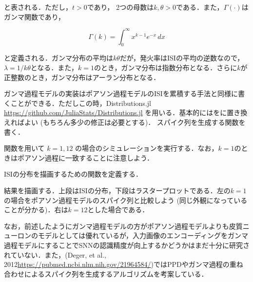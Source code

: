 と表される．ただし，$t > 0$であり， 2つの母数は$k, \theta > 0$である．また，$\Gamma (\cdot)$はガンマ関数であり，


\begin{equation}
\Gamma (k)=\int _{0}^{\infty }x^{k-1}e^{-x}\,dx
\end{equation}


と定義される．ガンマ分布の平均は$k\theta$だが，発火率はISIの平均の逆数なので，$\lambda=1/k\theta$となる．また，$k=1$のとき，ガンマ分布は指数分布となる．さらに$k$が正整数のとき，ガンマ分布はアーラン分布となる．

ガンマ過程モデルの実装はポアソン過程モデルのISIを累積する手法と同様に書くことができる．ただしこの時，Distributions.jl \url{https://github.com/JuliaStats/Distributions.jl} を用いる．基本的にはをに置き換えればよい (もちろん多少の修正は必要とする)．
スパイク列を生成する関数を書く．

 関数を用いて $k=1, 12$ の場合のシミュレーションを実行する．なお，$k=1$のときはポアソン過程に一致することに注意しよう．

ISIの分布を描画するための関数を定義する．

結果を描画する．上段はISIの分布，下段はラスタープロットである．左の$k=1$の場合をポアソン過程モデルのスパイク列と比較しよう (同じ外観になっていることが分かる)．右は$k=12$とした場合である．


なお，前述したようにガンマ過程モデルの方がポアソン過程モデルよりも皮質ニューロンのモデルとしては優れているが，入力画像のエンコーディングをガンマ過程モデルにすることでSNNの認識精度が向上するかどうかはまだ十分に研究されていない．また，(Deger, et al., 2012\url{https://pubmed.ncbi.nlm.nih.gov/21964584/})ではPPDやガンマ過程の重ね合わせによるスパイク列を生成するアルゴリズムを考案している．

